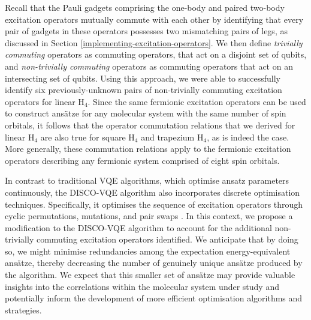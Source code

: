 Recall that the Pauli gadgets comprising the one-body and paired two-body excitation operators mutually commute with each other by identifying that every pair of gadgets in these operators possesses two mismatching pairs of legs, as discussed in Section \ref{implementing-excitation-operators}. We then define \textit{trivially commuting} operators as commuting operators, that act on a disjoint set of qubits, and \textit{non-trivially commuting} operators as commuting operators that act on an intersecting set of qubits. Using this approach, we were able to successfully identify six previously-unknown pairs of non-trivially commuting excitation operators for linear H$_4$. Since the same fermionic excitation operators can be used to construct ansätze for any molecular system with the same number of spin orbitals, it follows that the operator commutation relations that we derived for linear H$_4$ are also true for square H$_4$ and trapezium H$_4$, as is indeed the case. More generally, these commutation relations apply to the fermionic excitation operators describing any fermionic system comprised of eight spin orbitals.

In contrast to traditional VQE algorithms, which optimise ansatz parameters continuously, the DISCO-VQE algorithm also incorporates discrete optimisation techniques. Specifically, it optimises the sequence of excitation operators through cyclic permutations, mutations, and pair swaps \cite{Burton2023}. In this context, we propose a modification to the DISCO-VQE algorithm to account for the additional non-trivially commuting excitation operators identified. We anticipate that by doing so, we might minimise redundancies among the expectation energy-equivalent ansätze, thereby decreasing the number of genuinely unique ansätze produced by the algorithm. We expect that this smaller set of ansätze may provide valuable insights into the correlations within the molecular system under study and potentially inform the development of more efficient optimisation algorithms and strategies.

